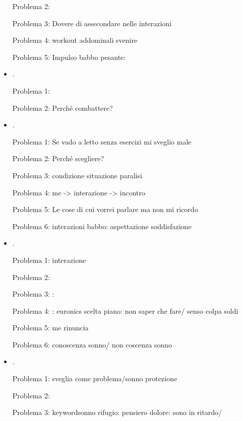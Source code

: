 \begin{itemize}
Problema 2: 

Problema 3: Dovere di assecondare nelle interazioni

Problema 4: workout addominali svenire

Problema 5: Impulso babbo pesante: 

\item {}.

Problema 1: 

Problema 2: Perch\'e combattere?

\item {}.

Problema 1: Se vado a letto senza esercizi mi sveglio male

Problema 2: Perch\'e scegliere?

Problema 3: condizione situazione paralisi

Problema 4: me -> interazione -> incontro

Problema 5: Le cose di cui vorrei parlare ma non mi ricordo

Problema 6: interazioni babbo: aspettazione soddisfazione

\item {}.

Problema 1: interazione 

Problema 2: 

Problema 3: : 

Problema 4: :
euronics scelta piano: non saper che fare/ senso colpa soldi

Problema 5: me rinuncia

Problema 6: conoscenza sonno/ non coscenza sonno


\item {}.

Problema 1: sveglia come problema/sonno protezione

Problema 2: 

Problema 3: keyword{sonno rifugio}: pensiero dolore: sono in ritardo/ 


\end{itemize}
